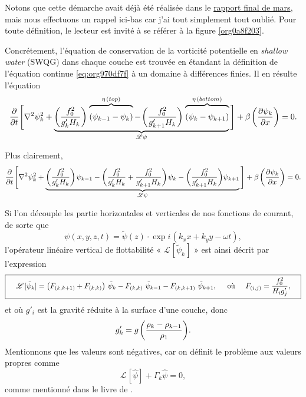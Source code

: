 \documentclass[10pt]{article}
\numberwithin{equation}{section}
\newcommand{\grande}{\vphantom{\frac{1}{xx}}}
\newcommand{\pt}{\hspace{1pt}} %
\newcommand{\tpsi}{\tilde{\psi}}
\begin{document}
Notons que cette démarche avait déjà été réalisée dans le \href{rapport-2023-03-31.pdf}{rapport final de mars}, mais nous effectuons un rappel ici-bas car j'ai tout simplement tout oublié.
Pour toute définition, le lecteur est invité à se référer à la figure \ref{org0a8f203}. \bigskip

Concrétement, l'équation de conservation de la vorticité potentielle en \emph{shallow water} (SWQG) dans chaque couche \autocite[p.186]{vallis_2006} est trouvée en étandant la définition de l'équation continue \ref{eq:org970df7f} à un domaine à différences finies.
Il en résulte l'équation
\begin{equation}
\label{eq:org8d8954b}
   \pdv{}{t} \Bigg[ \laplacian{\psi^2_k} + \underbrace{\qty(\frac{f_0^2}{g_k' H_k})\pt \overbrace{\qty(\psi_{k-1}-\psi_k)\grande}^{\eta\pt(top)} -\pt \qty(\frac{f_0^2}{g_{k+1}' H_k})\pt \overbrace{\qty(\psi_{k} - \psi_{k+1})\grande}^{\eta\pt(bottom)}}_{\mathscr{L \psi}} \Bigg] + \beta\pt \qty(\pdv{\psi_k}{x}) = 0.
\end{equation}

Plus clairement,
\begin{equation}
   \pdv{}{t} \Bigg[ \laplacian{\psi^2_k} + \underbrace{\qty(\frac{f_0^2}{g_k' H_k})\pt \psi_{k-1} - \qty(\frac{f_0^2}{g_k' H_k} + \frac{f_0^2}{g_{k+1}' H_k}) \pt \psi_{k} - \qty(\frac{f_0^2}{g_{k+1}' H_k})\psi_{k+1}}_\mathscr{L\psi} \Bigg] + \beta\pt \qty(\pdv{\psi_k}{x}) = 0.
\end{equation}

Si l'on découple les partie horizontales et verticales de nos fonctions de courant, de sorte que
\begin{equation}
   \psi(x,y,z,t) = \tpsi(z) \cdot\exp{i\pt(k_x x + k_y y -\omega t)},
\end{equation}
l'opérateur linéaire vertical de flottabilité « \(\mathscr{L}\pt[\tpsi_k\pt]\) » est ainsi décrit par l'expression
\begin{equation}
\boxed{\hspace{0.4cm}
\mathscr{L}\pt[\tpsi_k] = \qty( F_{(k,k+1)} + F_{(k,k)}) \ \tpsi_k
- F_{(k,k)}\ \tpsi_{k-1}
- F_{(k,k+1)}\ \tpsi_{k+1},
\hspace{0.5cm}\text{où}\hspace{0.5cm}
F_{(i,j)} = \frac{f_0^2}{H_i g'_j},
\hspace{0.4cm} }
\end{equation}
et où \(g'_i\) est la gravité réduite à la surface d'une couche, donc
\begin{equation}
g_k' = g \pt\qty(\frac{\rho_k - \rho_{k-1}}{\rho_1}).
\end{equation}
Mentionnons que les valeurs sont négatives, car on définit le problème aux valeurs propres comme
\begin{equation}
   \mathscr{L}\pt [\hat{\psi}] + \Gamma_k\hat{\psi} = 0,
\end{equation}
comme mentionné dans le livre de \textcite[p.469]{vallis_2006}. \bigskip
\end{document}
